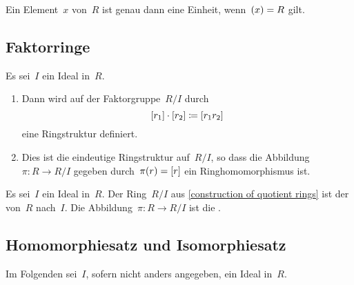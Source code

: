 \begin{proposition}
  Ein Element~$x$ von~$R$ ist genau dann eine Einheit, wenn~$(x) = R$ gilt.
\end{proposition}



\subsection{Faktorringe}

\begin{lemma}
  \label{construction of quotient rings}
  Es sei~$I$ ein Ideal in~$R$.
  \begin{enumerate}
    \item
      Dann wird auf der Faktorgruppe~$R/I$ durch
      \[
        [r_1] \cdot [r_2]
        \coloneqq
        [r_1 r_2]
      \]
      eine Ringstruktur definiert.
    \item
      Dies ist die eindeutige Ringstruktur auf~$R/I$, so dass die Abbildung~$\pi \colon R \to R/I$ gegeben durch~$\pi(r) = [r]$ ein Ringhomomorphismus ist.
  \end{enumerate}
\end{lemma}

\begin{definition}
  Es sei~$I$ ein Ideal in~$R$.
  Der Ring~$R/I$ aus \cref{construction of quotient rings} ist der  von~$R$ nach~$I$.
  Die Abbildung~$\pi \colon R \to R/I$ ist die .
\end{definition}



\subsection{Homomorphiesatz und Isomorphiesatz}

\begin{convention}
  Im Folgenden sei~$I$, sofern nicht anders angegeben, ein Ideal in~$R$.
\end{convention}


